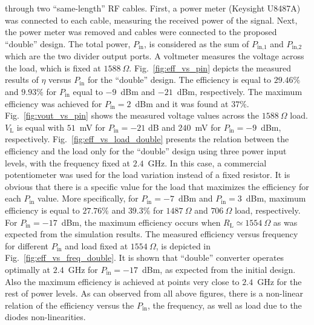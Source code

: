 \documentclass[journal]{IEEEtran}
\begin{document}
through two ``same-length'' RF cables.
%
First,  a power meter (Keysight U8487A) was connected to each cable, measuring the received power of the signal. 
%
Next, the power meter was removed and cables were connected to the proposed ``double'' design.
%
The total power, $P_\text{in}$, is considered as the sum of $P_\text{in,1}$ and  $P_\text{in,2}$ which are the two divider output ports.
%
A voltmeter measures the voltage across the load, which is
fixed at  $1588~\Omega$. 
%
Fig.~\ref{fig:eff_vs_pin} depicts the measured results of $\eta$
versus  $P_\text{in}$ for the ``double'' design.
%
The efficiency is equal to $29.46\%$ and $9.93\%$ for $P_\text{in}$ equal to $-9$~dBm and $-21$~dBm, respectively.
%
The maximum  efficiency was achieved for $P_\text{in}=2$~dBm and it was found at $37\%$.
%
Fig.~\ref{fig:vout_vs_pin} shows the measured voltage values across the $1588~\Omega$  load. $V_\text{L}$ is equal with $51$~mV for  $P_\text{in}=-21$ dB and $240$~mV for $P_\text{in}=-9$~dBm, respectively.
%
%
Fig.~\ref{fig:eff_vs_load_double} presents the relation between the
efficiency and the load only for the ``double'' design using three power input levels, with the frequency fixed at $2.4$~GHz. 
%
In this case, a commercial potentiometer  was used for the load variation instead of a fixed resistor.
%
%
It is obvious that there is a specific value for the load  that maximizes the efficiency for  each  $P_\text{in}$ value.
%
More specifically, for  $P_\text{in}=-7$~dBm  and  $P_\text{in}=3$~dBm, maximum efficiency is equal to $27.76 \%$ and $39.3\%$ for $1487~\Omega$ and $706~\Omega$ load, respectively.
%
For $P_\text{in}=-17$~dBm, the maximum efficiency occurs when $R_\text{L}\simeq1554~\Omega$ as was expected from the simulation results.
%
The measured efficiency versus frequency for different  $P_\text{in}$ and load fixed at $1554~\Omega$, is depicted in Fig.~\ref{fig:eff_vs_freq_double}.
%
It is shown that  ``double'' converter operates optimally at $2.4$~GHz for $P_\text{in}=-17$~dBm, as expected from the initial design. 
%
Also  the maximum efficiency is achieved at points very close to $2.4$~GHz for the rest of  power levels.
%
As can  observed from all above figures, there is a non-linear relation of the efficiency versus the  $P_\text{in}$, the frequency, as well as load  due to the diodes non-linearities.
%
\end{document}
